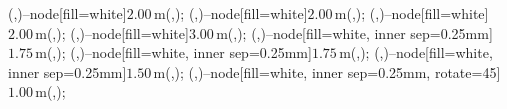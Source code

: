 {	\small

	 (\QQx,\Ay)--node[fill=white]{$2.00\,$m}(\QQx,\Fy);
	 (\QQx,\Fy)--node[fill=white]{$2.00\,$m}(\QQx,\Cy);
	 (\Qx,\Ey)--node[fill=white]{$2.00\,$m}(\Qx,\Dy);
	 (\Qx,\Dy)--node[fill=white]{$3.00\,$m}(\Qx,\Cy);
	 (\Ax,\Py)--node[fill=white, inner sep=0.25mm]{$1.75\,$m}(\Fx,\Py);
	 (\Fx,\Py)--node[fill=white, inner sep=0.25mm]{$1.75\,$m}(\Cx,\Py);
	 (\Cx,\Py)--node[fill=white, inner sep=0.25mm]{$1.50\,$m}(\Dx,\Py);
	 (\Dx,\Py)--node[fill=white, inner sep=0.25mm, rotate=45]{$1.00\,$m}(\Ex,\Py);



}
